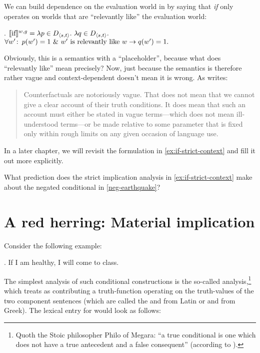 We can build dependence on the evaluation world in by saying that \emph{if} only
operates on worlds that are ``relevantly like'' the evaluation world:

\ex.\label{ex:if-strict-context} $\llbracket \mbox{if} \rrbracket^{w,g} = \lambda p \in D_{\langle s,t \rangle}.\ \lambda q \in
D_{\langle s,t \rangle}.$ \\ \null\hfill $\forall w'\colon\thinspace p(w')=1\ \&\ w' \text{ is
  relevantly like } w \rightarrow q(w')=1.$

Obviously, this is a semantics with a ``placeholder'', because what does
``relevantly like'' mean precisely? Now, just because the semantics is therefore
rather vague and context-dependent doesn't mean it is wrong. As
\textcite{lewis:1973:counterfactuals} writes:

\begin{quote} Counterfactuals are notoriously vague. That does not mean that we
cannot give a clear account of their truth conditions. It does mean that such an
account must either be stated in vague terms---which does not mean ill-understood
terms---or be made relative to some parameter that is fixed only within rough
limits on any given occasion of language use.
\end{quote}

\noindent In a later chapter, we will revisit the formulation in
\ref{ex:if-strict-context} and fill it out more explicitly. 
 
\begin{exercise}
	What prediction does the strict implication analysis in
  \ref{ex:if-strict-context} make about the negated conditional in \ref{neg-earthquake}? \eex
\end{exercise}
\section{A red herring: Material implication}

Consider the following example:

\ex. If I am healthy, I will come to class.

The simplest analysis of such conditional constructions is the so-called  analysis,\footnote{Quoth the Stoic philosopher Philo of Megara: ``a true conditional is one which does not have a true antecedent and a false consequent'' (according to \citet[II, 110--112]{sextus-empiricus:200:outlines}).} which treats  as contributing a truth-function operating on the truth-values of the two component sentences (which are called the  and  \dash from Latin \dash or  and  \dash from Greek). The lexical entry for  would look as follows:

